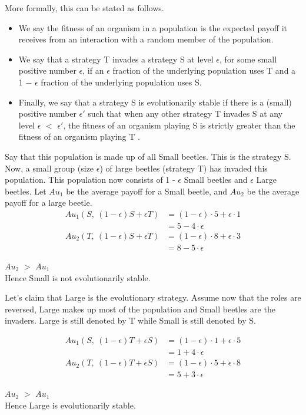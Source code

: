 \documentclass[11pt]{article}
\theoremstyle{definition}
\begin{document}
More formally, this can be stated as follows.
\begin{itemize}
\itemsep0em
\item We say the fitness of an organism in a population is the expected payoff it receives from an interaction with a random member of the population.
\item We say that a strategy T invades a strategy S at level $\epsilon$, for some small positive number $\epsilon$, if an $\epsilon$ fraction of the underlying population uses T and a 1 − $\epsilon$ fraction of the underlying population uses S.
\item Finally, we say that a strategy S is evolutionarily stable if there is a (small) positive number $\epsilon'$ such that when any other strategy T invades S at any level $\epsilon$ $<$ $\epsilon'$, the fitness of an organism playing S is strictly greater than the fitness of an organism playing T .
\end{itemize}


Say that this population is made up of all Small beetles. This is the strategy S. Now, a small group (size $\epsilon$) of large beetles (strategy T) has invaded this population. This population now consists of 1 - $\epsilon$ Small beetles and $\epsilon$ Large beetles. Let $Au_1$ be the average payoff for a Small beetle, and $Au_2$ be the average payoff for a large beetle. 
\begin{align}
Au_1(S,\ (1-\epsilon)S + {\epsilon}T) &= (1-\epsilon){\cdot}5 + \epsilon{\cdot}1 \nonumber \\
& = 5 - 4{\cdot}\epsilon \nonumber
\end{align}
\begin{align}
Au_2(T,\ (1-\epsilon)S + {\epsilon}T) &= (1-\epsilon){\cdot}8 + \epsilon{\cdot}3 \nonumber \\
& = 8 - 5{\cdot}\epsilon \nonumber
\end{align}
\begin{center}
$Au_2$ $>$ $Au_1$ \\
Hence Small is not evolutionarily stable.
\end{center}

Let's claim that Large is the evolutionary strategy. Assume now that the roles are reversed, Large makes up most of the population and Small beetles are the invaders. Large is still denoted by T while Small is still denoted by S.

\begin{align}
Au_1(S,\ (1-\epsilon)T + {\epsilon}S) &= (1-\epsilon){\cdot}1 + \epsilon{\cdot}5 \nonumber \\
& = 1 + 4{\cdot}\epsilon \nonumber
\end{align}
\begin{align}
Au_2(T,\ (1-\epsilon)T + {\epsilon}S) &= (1-\epsilon){\cdot}5 + \epsilon{\cdot}8 \nonumber \\
& = 5 + 3{\cdot}\epsilon \nonumber
\end{align}
\begin{center}
$Au_2$ $>$ $Au_1$ \\
Hence Large is evolutionarily stable.
\end{center}
\end{document}
